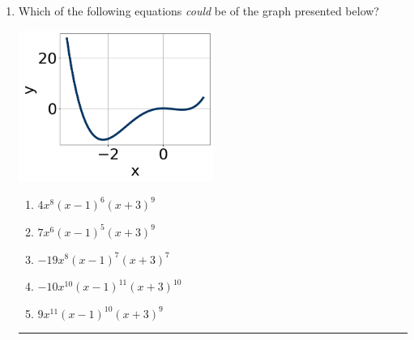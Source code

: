 \documentclass[14pt]{extbook}
\newcommand{\litem}[1]{\item#1\hspace*{-1cm}\rule{\textwidth}{0.4pt}}
\begin{document}
\begin{enumerate}
{\begin{enumerate}[label=\Alph*.]
\end{enumerate} }
\litem{
Which of the following equations \textit{could} be of the graph presented below?
\begin{center}
    \includegraphics[width=0.5\textwidth]{../Figures/polyGraphToFunctionCopyB.png}
\end{center}
\begin{enumerate}[label=\Alph*.]
\item \( 4x^{8} (x - 1)^{6} (x + 3)^{9} \)
\item \( 7x^{6} (x - 1)^{5} (x + 3)^{9} \)
\item \( -19x^{8} (x - 1)^{7} (x + 3)^{7} \)
\item \( -10x^{10} (x - 1)^{11} (x + 3)^{10} \)
\item \( 9x^{11} (x - 1)^{10} (x + 3)^{9} \)


\end{enumerate}}
\end{enumerate}
\end{document}
